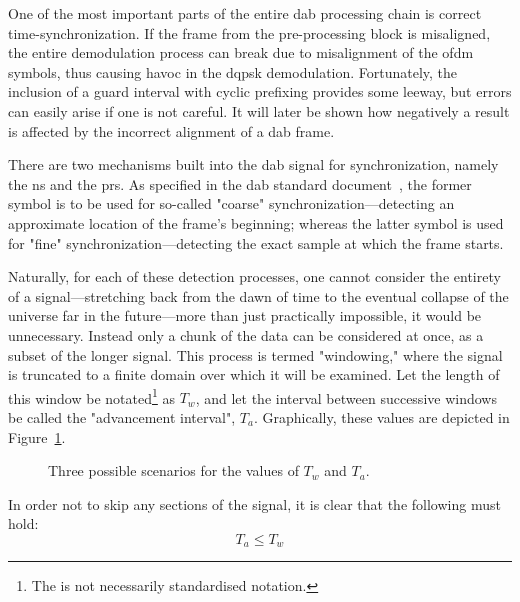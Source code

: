 \documentclass[class=report,11pt,crop=false]{standalone}
\begin{document}
One of the most important parts of the entire \gls{dab} processing chain is correct time-synchronization. If the frame from the pre-processing block is misaligned, the entire demodulation process can break due to misalignment of the \gls{ofdm} symbols, thus causing havoc in the \gls{dqpsk} demodulation. Fortunately, the inclusion of a guard interval with cyclic prefixing provides some leeway, but errors can easily arise if one is not careful. It will later be shown how negatively a result is affected by the incorrect alignment of a \gls{dab} frame.

There are two mechanisms built into the \gls{dab} signal for synchronization, namely the \acrfull{ns} and the \acrfull{prs}. As specified in the \gls{dab} standard document~\cite{dabstandard}, the former symbol is to be used for so-called "coarse" synchronization---detecting an approximate location of the frame's beginning; whereas the latter symbol is used for "fine" synchronization---detecting the exact sample at which the frame starts. 

Naturally, for each of these detection processes, one cannot consider the entirety of a signal---stretching back from the dawn of time to the eventual collapse of the universe far in the future---more than just practically impossible, it would be unnecessary. Instead only a chunk of the data can be considered at once, as a subset of the longer signal. This process is termed "windowing," where the signal is truncated to a finite domain over which it will be examined. Let the length of this window be notated\footnote{The is not necessarily standardised notation.} as \(T_w\), and let the interval between successive windows be called the "advancement interval", \(T_a\). Graphically, these values are depicted in Figure~\ref{fig:window_advance_illustration}.

\begin{figure}[htbp]
  \centering
  \captionsetup{type=figure}
  \def\svgwidth{\linewidth}
  { %
      }
      \caption{Three possible scenarios for the values of \(T_w\) and \(T_a\).}
      \label{fig:window_advance_illustration}
\end{figure}

In order not to skip any sections of the signal, it is clear that the following must hold:
\begin{equation}
  T_a \le T_w
\end{equation}
\end{document}
